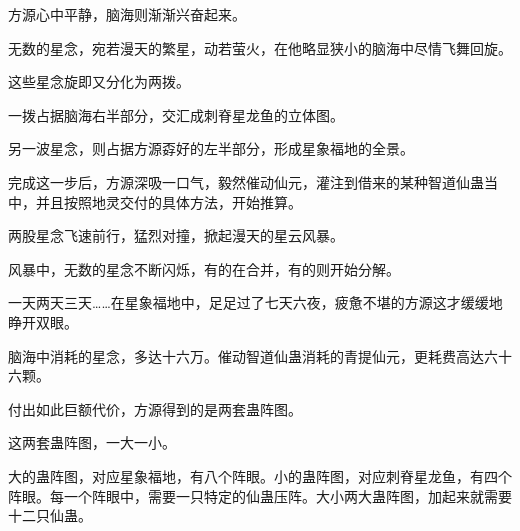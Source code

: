 \begin{this_body}
方源心中平静，脑海则渐渐兴奋起来。

无数的星念，宛若漫天的繁星，动若萤火，在他略显狭小的脑海中尽情飞舞回旋。

这些星念旋即又分化为两拨。

一拨占据脑海右半部分，交汇成刺脊星龙鱼的立体图。

另一波星念，则占据方源孬好的左半部分，形成星象福地的全景。

完成这一步后，方源深吸一口气，毅然催动仙元，灌注到借来的某种智道仙蛊当中，并且按照地灵交付的具体方法，开始推算。

两股星念飞速前行，猛烈对撞，掀起漫天的星云风暴。

风暴中，无数的星念不断闪烁，有的在合并，有的则开始分解。

一天两天三天……在星象福地中，足足过了七天六夜，疲惫不堪的方源这才缓缓地睁开双眼。

脑海中消耗的星念，多达十六万。催动智道仙蛊消耗的青提仙元，更耗费高达六十六颗。

付出如此巨额代价，方源得到的是两套蛊阵图。

这两套蛊阵图，一大一小。

大的蛊阵图，对应星象福地，有八个阵眼。小的蛊阵图，对应刺脊星龙鱼，有四个阵眼。每一个阵眼中，需要一只特定的仙蛊压阵。大小两大蛊阵图，加起来就需要十二只仙蛊。

\end{this_body}

